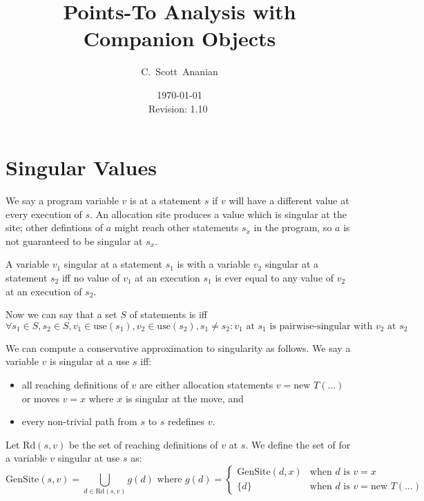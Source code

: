 \documentclass[11pt,notitlepage]{article}
\author{C.~Scott~Ananian}
\title{Points-To Analysis with Companion Objects}
\date{\today \\ $ $Revision: 1.10 $ $}
\begin{document}

\maketitle
\section{Singular Values}

We say a program variable $v$ is  at a statement $s$
if $v$ will have a different value at every execution of $s$.  An
allocation site  produces a value which is singular
at the site; other defintions of $a$ might reach other statements
$s_x$ in the program, so $a$ is not guaranteed to be singular at $s_x$.

A variable $v_1$ singular at a statement $s_1$ is
 with a variable $v_2$ singular at a statement
$s_2$ iff no value of $v_1$ at an execution $s_1$ is ever equal to any
value of $v_2$ at an execution of $s_2$.

Now we can say that a set $S$ of statements is
 iff
\begin{displaymath}
\forall s_1 \in S, s_2 \in S, v_1 \in \text{use}(s_1), v_2 \in \text{use}(s_2),
  s_1 \neq s_2 :
v_1 \text{ at } s_1 \text{ is pairwise-singular with } v_2 \text{ at } s_2
\end{displaymath}

We can compute a conservative approximation to singularity as follows.
We say a variable $v$ is singular at a use $s$ iff:
\begin{itemize}
\item all reaching definitions of $v$ are either allocation statements 
$v = \text{new }T(\ldots)$ or moves $v = x$ where $x$ is singular at
the move, and
\item every non-trivial path from $s$ to $s$ redefines $v$.
\end{itemize}

Let $\text{Rd}(s,v)$ be the set of reaching definitions of $v$ at $s$.
We define the set of  for a variable $v$ singular at
use $s$ as:
\begin{displaymath}
\text{GenSite}(s,v) %
 =
\bigcup_{d \in \text{Rd}(s,v)} g(d)
\text{ where }
g(d) = \left\{ \begin{array}{cl}
                \text{GenSite}(d,x) &\text{when } d \text{ is } v=x \\
		\{d\}&\text{when } d \text{ is } v=\text{new } T(\ldots)
                \end{array}\right.
\end{displaymath}
\end{document}

